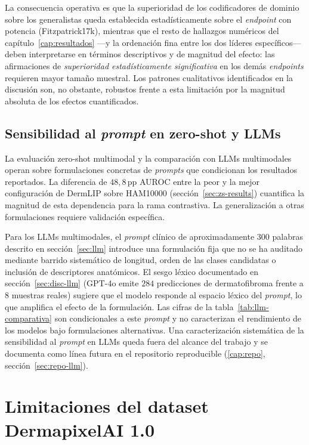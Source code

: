 La consecuencia operativa es que la superioridad de los codificadores de
dominio sobre los generalistas queda establecida estadísticamente sobre
el \emph{endpoint} con potencia (Fitzpatrick17k), mientras que el resto
de hallazgos numéricos del capítulo~\ref{cap:resultados} ---y la
ordenación fina entre los dos líderes específicos--- deben interpretarse
en términos descriptivos y de magnitud del efecto: las afirmaciones de
\emph{superioridad estadísticamente significativa} en los demás
\emph{endpoints} requieren mayor tamaño muestral. Los patrones
cualitativos identificados en la discusión son, no obstante, robustos
frente a esta limitación por la magnitud absoluta de los efectos
cuantificados.

\subsection{Sensibilidad al \emph{prompt} en zero-shot y LLMs}
\label{sec:lim-prompts}

La evaluación zero-shot multimodal y la comparación con LLMs
multimodales operan sobre formulaciones concretas de \emph{prompts}
que condicionan los resultados reportados. La diferencia de
$48{,}8$\,pp AUROC entre la peor y la mejor configuración de
DermLIP sobre HAM10000 (sección~\ref{sec:zs-results}) cuantifica la
magnitud de esta dependencia para la rama contrastiva. La
generalización a otras formulaciones requiere validación
específica.

Para los LLMs multimodales, el \emph{prompt} clínico de
aproximadamente $300$ palabras descrito en sección~\ref{sec:llm}
introduce una formulación fija que no se ha auditado mediante
barrido sistemático de longitud, orden de las clases candidatas o
inclusión de descriptores anatómicos. El sesgo léxico documentado
en sección~\ref{sec:disc-llm} (GPT-4o emite $284$ predicciones de
dermatofibroma frente a $8$ muestras reales) sugiere que el
modelo responde al espacio léxico del \emph{prompt}, lo que
amplifica el efecto de la formulación. Las cifras de la
tabla~\ref{tab:llm-comparativa} son condicionales a este
\emph{prompt} y no caracterizan el rendimiento de los modelos bajo
formulaciones alternativas. Una caracterización sistemática de la
sensibilidad al \emph{prompt} en LLMs queda fuera del alcance del
trabajo y se documenta como línea futura en el
repositorio reproducible (\ref{cap:repo}, sección~\ref{sec:repo-llm}).

\section{Limitaciones del dataset DermapixelAI 1.0}
\label{sec:lim-dermapixel}

